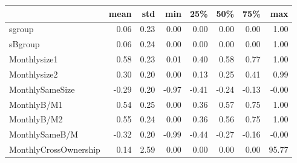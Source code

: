 \begin{tabular}{lrrrrrrr}
\toprule
{} &  mean &   std &   min &   25\% &   50\% &   75\% &    max \\
\midrule
sgroup                &  0.06 &  0.23 &  0.00 &  0.00 &  0.00 &  0.00 &   1.00 \\
sBgroup               &  0.06 &  0.24 &  0.00 &  0.00 &  0.00 &  0.00 &   1.00 \\
Monthlysize1          &  0.58 &  0.23 &  0.01 &  0.40 &  0.58 &  0.77 &   1.00 \\
Monthlysize2          &  0.30 &  0.20 &  0.00 &  0.13 &  0.25 &  0.41 &   0.99 \\
MonthlySameSize       & -0.29 &  0.20 & -0.97 & -0.41 & -0.24 & -0.13 &  -0.00 \\
MonthlyB/M1           &  0.54 &  0.25 &  0.00 &  0.36 &  0.57 &  0.75 &   1.00 \\
MonthlyB/M2           &  0.55 &  0.24 &  0.00 &  0.36 &  0.56 &  0.75 &   1.00 \\
MonthlySameB/M        & -0.32 &  0.20 & -0.99 & -0.44 & -0.27 & -0.16 &  -0.00 \\
MonthlyCrossOwnership &  0.14 &  2.59 &  0.00 &  0.00 &  0.00 &  0.00 &  95.77 \\
\bottomrule
\end{tabular}
